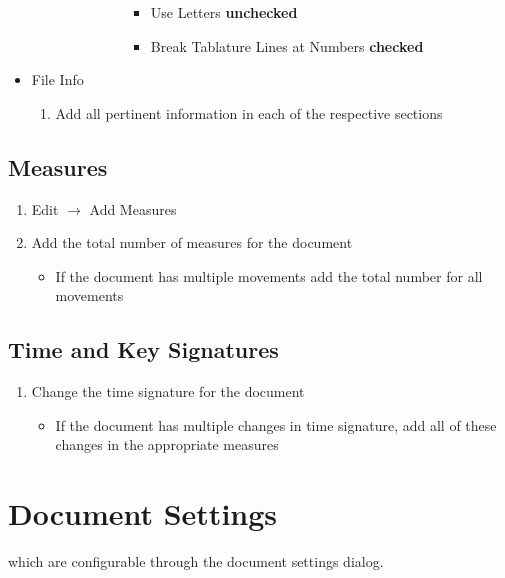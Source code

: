 \documentclass[]{tufte-book} %
\begin{document}
\begin{itemize}
\begin{enumerate}
\begin{enumerate}
\begin{enumerate}
\begin{enumerate}
          \begin{itemize}
          \item Use Letters \textbf{unchecked}
          \item Break Tablature Lines at Numbers \textbf{checked}
          \end{itemize}
        \end{enumerate}
      \end{enumerate}
    \end{enumerate}
  \end{enumerate}
\item File Info
  \begin{enumerate}
  \item Add all pertinent information in each of the respective sections 
  \end{enumerate}
\end{itemize}

\section{Measures}
\label{sec:measures}

\begin{enumerate}
\item Edit $\rightarrow$ Add Measures
\item Add the total number of measures for the document
  \begin{itemize}
  \item If the document has multiple movements add the total number for all movements
  \end{itemize}
\end{enumerate}

\section{Time and Key Signatures}
\label{sec:time-key-signatures}

\begin{enumerate}
\item Change the time signature for the document
  \begin{itemize}
  \item If the document has multiple changes in time signature, add all of these changes in the appropriate measures
  \end{itemize}
\end{enumerate}

\chapter{Document Settings}
 which are configurable through the
document settings dialog.
\end{document}
